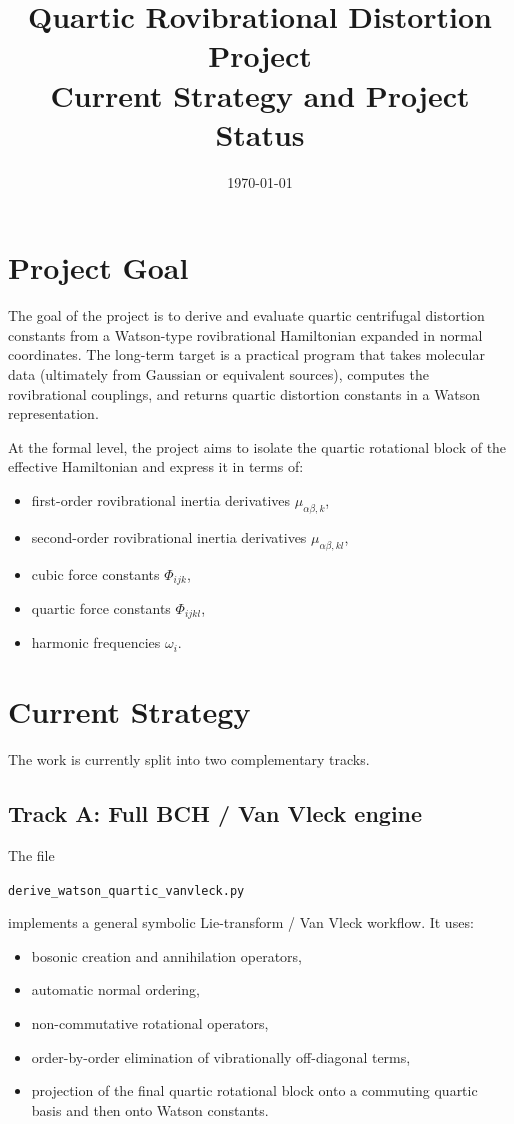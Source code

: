 \documentclass[11pt,a4paper]{article}
\title{Quartic Rovibrational Distortion Project\\
\large Current Strategy and Project Status}
\author{}
\date{\today}
\begin{document}
\maketitle

\section{Project Goal}
The goal of the project is to derive and evaluate quartic centrifugal distortion constants from a Watson-type rovibrational Hamiltonian expanded in normal coordinates. The long-term target is a practical program that takes molecular data (ultimately from Gaussian or equivalent sources), computes the rovibrational couplings, and returns quartic distortion constants in a Watson representation.

At the formal level, the project aims to isolate the quartic rotational block of the effective Hamiltonian and express it in terms of:
\begin{itemize}[leftmargin=*]
\item first-order rovibrational inertia derivatives \( \mu_{\alpha\beta,k} \),
\item second-order rovibrational inertia derivatives \( \mu_{\alpha\beta,kl} \),
\item cubic force constants \( \Phi_{ijk} \),
\item quartic force constants \( \Phi_{ijkl} \),
\item harmonic frequencies \( \omega_i \).
\end{itemize}

\section{Current Strategy}
The work is currently split into two complementary tracks.

\subsection{Track A: Full BCH / Van Vleck engine}
The file
\begin{center}
\texttt{derive\_watson\_quartic\_vanvleck.py}
\end{center}
implements a general symbolic Lie-transform / Van Vleck workflow. It uses:
\begin{itemize}[leftmargin=*]
\item bosonic creation and annihilation operators,
\item automatic normal ordering,
\item non-commutative rotational operators,
\item order-by-order elimination of vibrationally off-diagonal terms,
\item projection of the final quartic rotational block onto a commuting quartic basis and then onto Watson constants.
\end{itemize}
\end{document}
